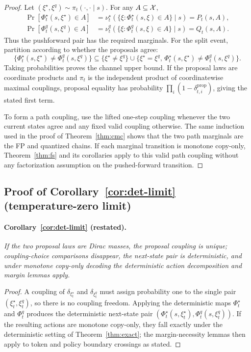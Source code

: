 \begin{proof}
Let $(\xi^\star,\xi^q)\sim\pi_t(\cdot,\cdot\mid s)$. For any $A\subseteq\mathcal{X}$,
\begin{align*}
\Pr\!\left[\Phi_t^\star(s,\xi^\star)\in A\right]
&=\nu_t^\star\!\left(\{\xi:\Phi_t^\star(s,\xi)\in A\}\mid s\right)
=P_t(s,A),\\
\Pr\!\left[\Phi_t^q(s,\xi^q)\in A\right]
&=\nu_t^q\!\left(\{\xi:\Phi_t^q(s,\xi)\in A\}\mid s\right)
=Q_t(s,A).
\end{align*}
Thus the pushforward pair has the required marginals. For the split event, partition according to
whether the proposals agree:
\[
\{\Phi_t^\star(s,\xi^\star)\ne\Phi_t^q(s,\xi^q)\}
\subseteq
\{\xi^\star\ne\xi^q\}
\cup
\{\xi^\star=\xi^q,\,\Phi_t^\star(s,\xi^\star)\ne\Phi_t^q(s,\xi^q)\}.
\]
Taking probabilities proves the channel upper bound. If the proposal laws are coordinate products
and $\pi_t$ is the independent product of coordinatewise maximal couplings, proposal equality has
probability $\prod_i(1-\delta_{t,i}^{\mathrm{prop}})$, giving the stated first term.

To form a path coupling, use the lifted one-step coupling whenever the two current states agree and
any fixed valid coupling otherwise. The same induction used in the proof of
Theorem~\ref{thm:cmc} shows that the two path marginals are the FP and quantized chains. If each
marginal transition is monotone copy-only, Theorem~\ref{thm:fs} and its corollaries apply to this
valid path coupling without any factorization assumption on the pushed-forward transition.
\end{proof}

\subsection{Proof of Corollary~\ref{cor:det-limit} (temperature-zero limit)}
\label{app:proofs:det-limit}

\paragraph{Corollary~\ref{cor:det-limit} (restated).}
\emph{If the two proposal laws are Dirac masses, the proposal coupling is unique; coupling-choice
comparisons disappear, the next-state pair is deterministic, and under monotone copy-only decoding
the deterministic action decomposition and margin lemmas apply.}

\begin{proof}
A coupling of $\delta_{\xi_t^\star}$ and $\delta_{\xi_t^q}$ must assign probability one to the
single pair $(\xi_t^\star,\xi_t^q)$, so there is no coupling freedom. Applying the deterministic maps
$\Phi_t^\star$ and $\Phi_t^q$ produces the deterministic next-state pair
$(\Phi_t^\star(s,\xi_t^\star),\Phi_t^q(s,\xi_t^q))$. If the resulting actions are monotone
copy-only, they fall exactly under the deterministic setting of Theorem~\ref{thm:exact}; the
margin-necessity lemmas then apply to token and policy boundary crossings as stated.
\end{proof}

